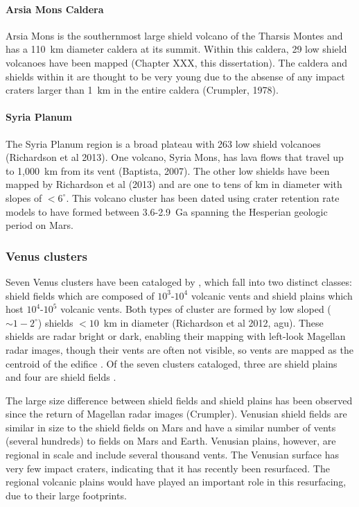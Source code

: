 \documentclass[12pt,letter]{article}
\begin{document}
\paragraph{Arsia Mons Caldera}
Arsia Mons is the southernmost large shield volcano of the Tharsis Montes and has a 110~km diameter caldera at its summit. Within this caldera, 29 low shield volcanoes have been mapped (Chapter XXX, this dissertation). The caldera and shields within it are thought to be very young due to the absense of any impact craters larger than 1~km in the entire caldera (Crumpler, 1978).

\paragraph{Syria Planum}
The Syria Planum region is a broad plateau with 263 low shield volcanoes (Richardson et al 2013). One volcano, Syria Mons, has lava flows that travel up to 1,000~km from its vent (Baptista, 2007). The other low shields have been mapped by Richardson et al (2013) and are one to tens of km in diameter with slopes of $<6^{\circ}$. This volcano cluster has been dated using crater retention rate models to have formed between 3.6-2.9~Ga spanning the Hesperian geologic period on Mars.


\subsubsection{Venus clusters}
Seven Venus clusters have been cataloged by \citet{Miller2012}, which fall into two distinct classes: shield fields which are composed of $10^3$-$10^4$ volcanic vents and shield plains which host $10^4$-$10^5$ volcanic vents. Both types of cluster are formed by low sloped ($\sim1-2^{\circ}$) shields $<10$~km in diameter (Richardson et al 2012, agu). These shields are radar bright or dark, enabling their mapping with left-look Magellan radar images, though their vents are often not visible, so vents are mapped as the centroid of the edifice \citep{Miller2012}. Of the seven clusters cataloged, three are shield plains and four are shield fields \citep{Miller2012}.

The large size difference between shield fields and shield plains has been observed since the return of Magellan radar images (Crumpler). Venusian shield fields are similar in size to the shield fields on Mars and have a similar number of vents (several hundreds) to fields on Mars and Earth. Venusian plains, however, are regional in scale and include several thousand vents. The Venusian surface has very few impact craters, indicating that it has recently been resurfaced. The regional volcanic plains would have played an important role in this resurfacing, due to their large footprints.
\end{document}
